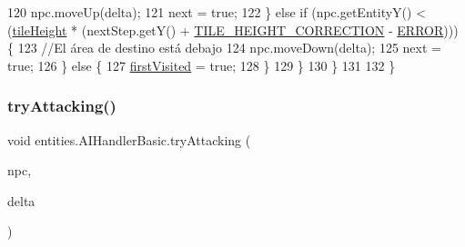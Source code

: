 \begin{DoxyCode}
120                     npc.moveUp(delta);
121                     next = \textcolor{keyword}{true};
122                 \} \textcolor{keywordflow}{else} \textcolor{keywordflow}{if} (npc.getEntityY() < (\mbox{\hyperlink{classentities_1_1_a_i_handler_basic_a9e9f42b3f5f874a95d171885e89c663c}{tileHeight}} * (nextStep.getY() + 
      \mbox{\hyperlink{classentities_1_1_a_i_handler_basic_a70edbc0e1b2c38d9201dffee01ac0fa8}{TILE\_HEIGHT\_CORRECTION}} - \mbox{\hyperlink{classentities_1_1_a_i_handler_basic_adf8c3c47d56647bb7fa2f411dc5f7ae3}{ERROR}}))) \{
123                     \textcolor{comment}{//El área de destino está debajo}
124                     npc.moveDown(delta);
125                     next = \textcolor{keyword}{true};
126                 \} \textcolor{keywordflow}{else} \{
127                     \mbox{\hyperlink{classentities_1_1_a_i_handler_basic_a2b833b13b6d0e6bf8014f077e8b07dda}{firstVisited}} = \textcolor{keyword}{true};
128                 \}
129             \}
130         \}
131 
132     \}
\end{DoxyCode}
\mbox{\label{classentities_1_1_a_i_handler_basic_a1f6e2dee1ad5ce70d198dacce17637fc}} 
\subsubsection{\texorpdfstring{try\+Attacking()}{tryAttacking()}}
{\footnotesize\ttfamily void entities.\+A\+I\+Handler\+Basic.\+try\+Attacking (\begin{DoxyParamCaption}\item[{\mbox{\hyperlink{classentities_1_1_n_p_c}{N\+PC}}}]{npc,  }\item[{long}]{delta }\end{DoxyParamCaption})\hspace{0.3cm}{\ttfamily [inline]}}


